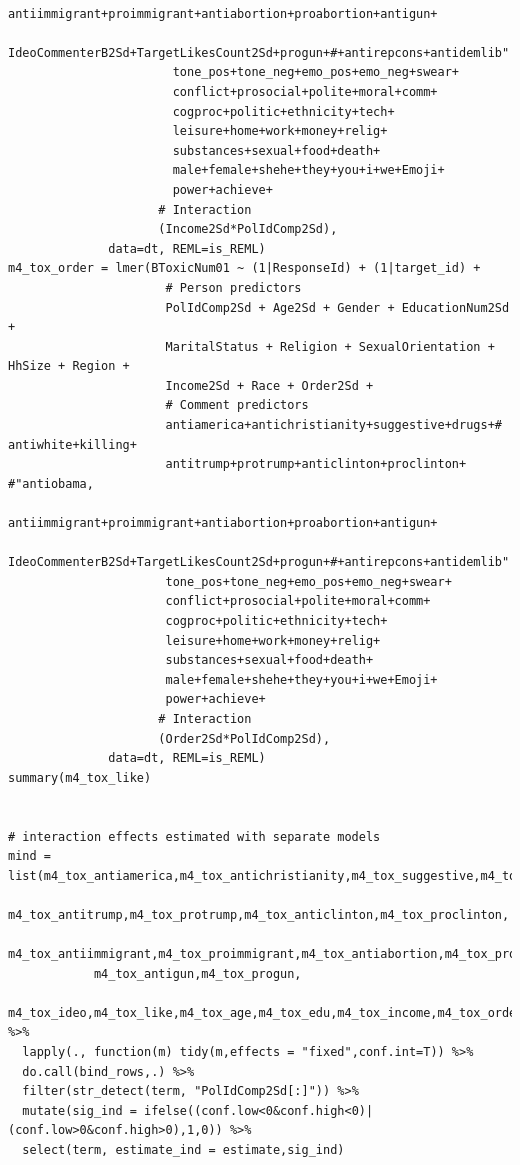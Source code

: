 \documentclass{article}
\begin{document}
\begin{lstlisting}
                       antiimmigrant+proimmigrant+antiabortion+proabortion+antigun+
                       IdeoCommenterB2Sd+TargetLikesCount2Sd+progun+#+antirepcons+antidemlib"
                       tone_pos+tone_neg+emo_pos+emo_neg+swear+
                       conflict+prosocial+polite+moral+comm+
                       cogproc+politic+ethnicity+tech+
                       leisure+home+work+money+relig+  
                       substances+sexual+food+death+    
                       male+female+shehe+they+you+i+we+Emoji+
                       power+achieve+
                     # Interaction
                     (Income2Sd*PolIdComp2Sd),
              data=dt, REML=is_REML)
m4_tox_order = lmer(BToxicNum01 ~ (1|ResponseId) + (1|target_id) + 
                      # Person predictors
                      PolIdComp2Sd + Age2Sd + Gender + EducationNum2Sd + 
                      MaritalStatus + Religion + SexualOrientation + HhSize + Region + 
                      Income2Sd + Race + Order2Sd + 
                      # Comment predictors  
                      antiamerica+antichristianity+suggestive+drugs+# antiwhite+killing+
                      antitrump+protrump+anticlinton+proclinton+ #"antiobama,
                      antiimmigrant+proimmigrant+antiabortion+proabortion+antigun+
                      IdeoCommenterB2Sd+TargetLikesCount2Sd+progun+#+antirepcons+antidemlib"
                      tone_pos+tone_neg+emo_pos+emo_neg+swear+
                      conflict+prosocial+polite+moral+comm+
                      cogproc+politic+ethnicity+tech+
                      leisure+home+work+money+relig+  
                      substances+sexual+food+death+    
                      male+female+shehe+they+you+i+we+Emoji+
                      power+achieve+
                     # Interaction
                     (Order2Sd*PolIdComp2Sd),
              data=dt, REML=is_REML)
summary(m4_tox_like)


# interaction effects estimated with separate models
mind = list(m4_tox_antiamerica,m4_tox_antichristianity,m4_tox_suggestive,m4_tox_drugs,
            m4_tox_antitrump,m4_tox_protrump,m4_tox_anticlinton,m4_tox_proclinton,
            m4_tox_antiimmigrant,m4_tox_proimmigrant,m4_tox_antiabortion,m4_tox_proabortion,
            m4_tox_antigun,m4_tox_progun,
            m4_tox_ideo,m4_tox_like,m4_tox_age,m4_tox_edu,m4_tox_income,m4_tox_order) %>% 
  lapply(., function(m) tidy(m,effects = "fixed",conf.int=T)) %>% 
  do.call(bind_rows,.) %>% 
  filter(str_detect(term, "PolIdComp2Sd[:]")) %>% 
  mutate(sig_ind = ifelse((conf.low<0&conf.high<0)|(conf.low>0&conf.high>0),1,0)) %>% 
  select(term, estimate_ind = estimate,sig_ind)


\end{lstlisting}
\end{document}

